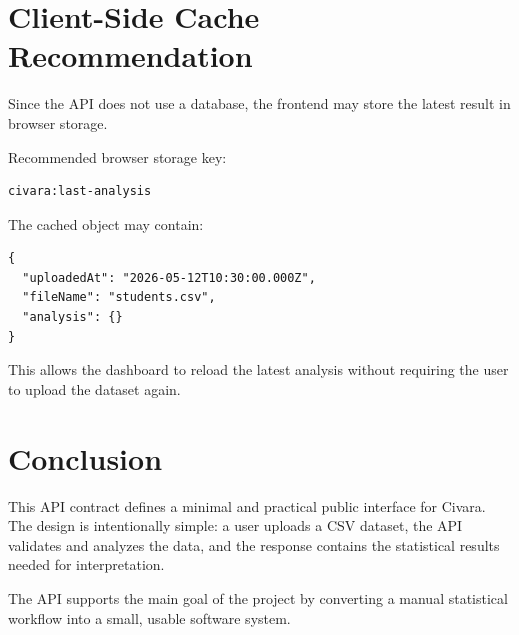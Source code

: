 \documentclass[12pt,a4paper]{article}
\begin{document}
\section{Client-Side Cache Recommendation}

Since the API does not use a database, the frontend may store the latest result in browser storage.

Recommended browser storage key:

\begin{lstlisting}
civara:last-analysis
\end{lstlisting}

The cached object may contain:

\begin{lstlisting}
{
  "uploadedAt": "2026-05-12T10:30:00.000Z",
  "fileName": "students.csv",
  "analysis": {}
}
\end{lstlisting}

This allows the dashboard to reload the latest analysis without requiring the user to upload the dataset again.

\section{Conclusion}

This API contract defines a minimal and practical public interface for Civara. The design is intentionally simple: a user uploads a CSV dataset, the API validates and analyzes the data, and the response contains the statistical results needed for interpretation.

The API supports the main goal of the project by converting a manual statistical workflow into a small, usable software system.
\end{document}
